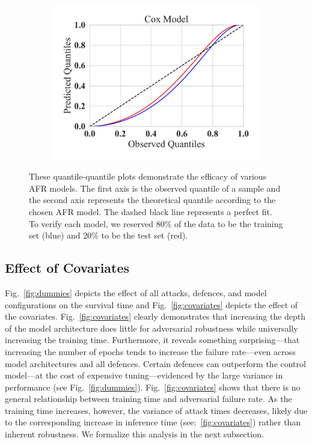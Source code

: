 \begin{figure}
\begin{subfigure}
	\end{subfigure}
	~
	\begin{subfigure}
		\centering
		\includegraphics[width=.32\textwidth]{plots/cox_qq.pdf}
	\end{subfigure}
	\caption{These quantile-quantile plots demonstrate the efficacy of various AFR models. The first axis is the observed quantile of a sample and the second axis represents the theoretical quantile according to the chosen AFR model. The dashed black line represents a perfect fit. To verify each model, we reserved 80\% of the data to be the training set (blue) and 20\% to be the test set (red). 
 }
	\label{fig:afr_models}
\end{figure}

\subsection{Effect of Covariates}
Fig.~\ref{fig:dummies} depicts the effect of all attacks, defences, and model configurations on the survival time and Fig.~\ref{fig:covariates} depicts the effect of the covariates. 
Fig.~\ref{fig:covariates} clearly demonstrates that increasing the depth of the model architecture does little for adversarial robustness while universally increasing the training time. 
Furthermore, it reveals something surprising---that increasing the number of epochs tends to increase the failure rate---even across model architectures and all defences. 
Certain defences can outperform the control model---at the cost of expensive tuning---evidenced by the large variance in performance (see Fig.~\ref{fig:dummies}). Fig.~\ref{fig:covariates} shows that there is no general relationship between training time and adversarial failure rate.
As the training time increases, however, the variance of attack times decreases, likely due to the corresponding increase in inference time (see:~\ref{fig:covariates}) rather than inherent robustness.
We formalize this analysis  in the next subsection.

